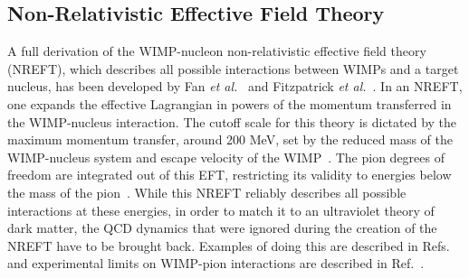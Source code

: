 \documentclass[reprint, showpacs,
preprintnumbers,
amsmath,amssymb,
aps, floatfix,
superscriptaddress,
prd, nofootinbib]{revtex4-1}
\begin{document}
\subsection{\label{subsec:theory}Non-Relativistic Effective Field Theory} 
A full derivation of the WIMP-nucleon non-relativistic effective field theory (NREFT), which describes all possible interactions between WIMPs and a target nucleus, has been developed by Fan \textit{et al.}~\cite{Fan_2010} and Fitzpatrick \textit{et al.}~\cite{Fitzpatrick:EFT}.
In an NREFT, one expands the effective Lagrangian in powers of the momentum transferred in the WIMP-nucleus interaction. 
The cutoff scale for this theory is dictated by the maximum momentum transfer, around 200 MeV, set by the reduced mass of the WIMP-nucleus system and escape velocity of the WIMP~\cite{Anand:MathematicaEFT}.
The pion degrees of freedom are integrated out of this EFT, restricting its validity to energies below the mass of the pion~\cite{Fitzpatrick:EFT}.
While this NREFT reliably describes all possible interactions at these energies, in order to match it to an ultraviolet theory of dark matter, the QCD dynamics that were ignored during the creation of the NREFT have to be brought back. 
Examples of doing this are described in Refs.~\cite{Bishara_2017,Hoferichter_2018,Xenon1t:eft_2022} and experimental limits on WIMP-pion interactions are described in Ref.~\cite{Xenon1t:wimp-pion-eft-2019}.
\end{document}
